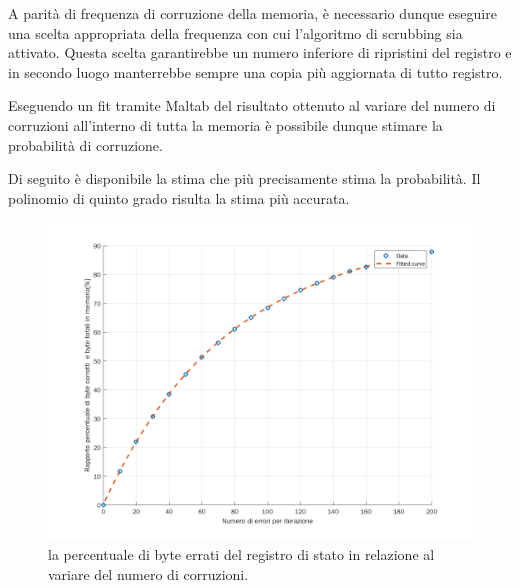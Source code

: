 \documentclass[LaM,binding=0.6cm]{../sapthesis}
\begin{document}
A parità di frequenza di corruzione della memoria, è necessario dunque eseguire una scelta appropriata della frequenza con cui l'algoritmo di scrubbing sia attivato. Questa scelta garantirebbe un numero inferiore di ripristini del registro e in secondo luogo manterrebbe sempre una copia più aggiornata di tutto registro.

Eseguendo un fit tramite Maltab del risultato ottenuto al variare del numero di corruzioni all'interno di tutta la memoria è possibile dunque stimare la probabilità di corruzione.

Di seguito è disponibile la stima che più precisamente stima la probabilità. Il polinomio di quinto grado risulta la stima più accurata.

\begin{figure}[htbp]
\centerline{\includegraphics[scale=0.6]{examples/scrubbingTestParziali.png}}
\caption{la percentuale di byte errati del registro di stato in relazione al variare del numero di corruzioni.}
\label{fig}
\end{figure}
\vspace{0.5cm}
\newpage
\end{document}
